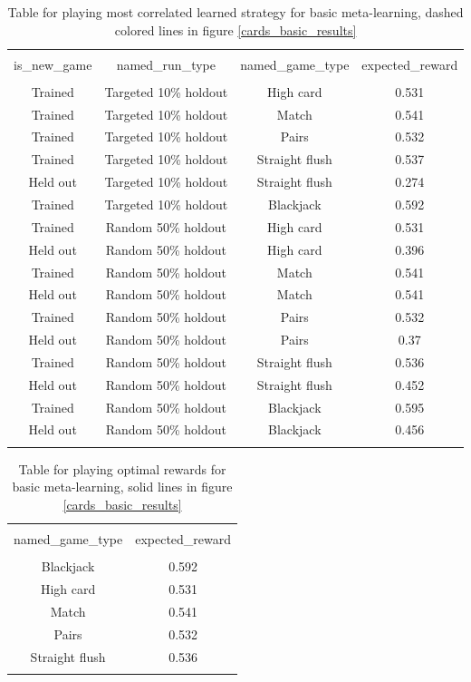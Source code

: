 \begin{table}[H]
\scriptsize
\centering
\begin{tabular}{@{\extracolsep{5pt}} cccc}
\\[-1.8ex]\hline
\hline \\[-1.8ex]
is\_new\_game & named\_run\_type & named\_game\_type & expected\_reward \\
\hline \\[-1.8ex]
Trained & Targeted 10\% holdout & High card & 0.531 \\
Trained & Targeted 10\% holdout & Match & 0.541 \\
Trained & Targeted 10\% holdout & Pairs & 0.532 \\
Trained & Targeted 10\% holdout & Straight flush & 0.537 \\
Held out & Targeted 10\% holdout & Straight flush & 0.274 \\
Trained & Targeted 10\% holdout & Blackjack & 0.592 \\
Trained & Random 50\% holdout & High card & 0.531 \\
Held out & Random 50\% holdout & High card & 0.396 \\
Trained & Random 50\% holdout & Match & 0.541 \\
Held out & Random 50\% holdout & Match & 0.541 \\
Trained & Random 50\% holdout & Pairs & 0.532 \\
Held out & Random 50\% holdout & Pairs & 0.37 \\
Trained & Random 50\% holdout & Straight flush & 0.536 \\
Held out & Random 50\% holdout & Straight flush & 0.452 \\
Trained & Random 50\% holdout & Blackjack & 0.595 \\
Held out & Random 50\% holdout & Blackjack & 0.456 \\
\hline \\[-1.8ex]
\end{tabular}
\caption{Table for playing most correlated learned strategy for basic meta-learning, dashed colored lines in figure \ref{cards_basic_results}}
\end{table}

\begin{table}[H]
\scriptsize
\centering
\begin{tabular}{@{\extracolsep{5pt}} cc}
\\[-1.8ex]\hline
\hline \\[-1.8ex]
named\_game\_type & expected\_reward \\
\hline \\[-1.8ex]
Blackjack & 0.592 \\
High card & 0.531 \\
Match & 0.541 \\
Pairs & 0.532 \\
Straight flush & 0.536 \\
\hline \\[-1.8ex]
\end{tabular}
\caption{Table for playing optimal rewards for basic meta-learning, solid lines in figure \ref{cards_basic_results}}
\end{table}


